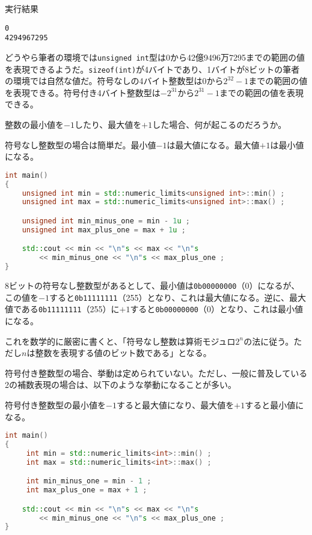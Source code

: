 実行結果

\begin{lstlisting}[style=terminal]
0
4294967295
\end{lstlisting}

どうやら筆者の環境では\texttt{unsigned int}型は0から42億9496万7295までの範囲の値を表現できるようだ。\texttt{sizeof(int)}が4バイトであり、1バイトが8ビットの筆者の環境では自然な値だ。符号なしの4バイト整数型は0から\(2^{32}-1\)までの範囲の値を表現できる。符号付き4バイト整数型は\(-2^{31}\)から\(2^{31}-1\)までの範囲の値を表現できる。

整数の最小値を\(-1\)したり、最大値を\(+1\)した場合、何が起こるのだろうか。

符号なし整数型の場合は簡単だ。最小値\(-1\)は最大値になる。最大値\(+1\)は最小値になる。

\ifTombow\pagebreak\fi
\begin{lstlisting}[language={C++}]
int main()
{
    unsigned int min = std::numeric_limits<unsigned int>::min() ;
    unsigned int max = std::numeric_limits<unsigned int>::max() ;

    unsigned int min_minus_one = min - 1u ;
    unsigned int max_plus_one = max + 1u ;

    std::cout << min << "\n"s << max << "\n"s
        << min_minus_one << "\n"s << max_plus_one ;
}
\end{lstlisting}

8ビットの符号なし整数型があるとして、最小値は\texttt{0b00000000}（0）になるが、この値を\(-1\)すると\texttt{0b11111111}（255）となり、これは最大値になる。逆に、最大値である\texttt{0b11111111}（255）に\(+1\)すると\texttt{0b00000000}（0）となり、これは最小値になる。

これを数学的に厳密に書くと、「符号なし整数は算術モジュロ\(2^n\)の法に従う。ただし\(n\)は整数を表現する値のビット数である」となる。

符号付き整数型の場合、挙動は定められていない。ただし、一般に普及している2の補数表現の場合は、以下のような挙動になることが多い。

符号付き整数型の最小値を\(-1\)すると最大値になり、最大値を\(+1\)すると最小値になる。

\begin{lstlisting}[language={C++}]
int main()
{
     int min = std::numeric_limits<int>::min() ;
     int max = std::numeric_limits<int>::max() ;

     int min_minus_one = min - 1 ;
     int max_plus_one = max + 1 ;

    std::cout << min << "\n"s << max << "\n"s
        << min_minus_one << "\n"s << max_plus_one ;
}
\end{lstlisting}

